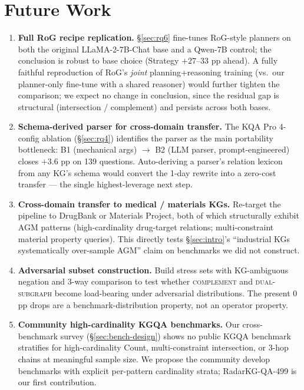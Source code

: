 \documentclass[11pt,a4paper]{article}
\newcommand{\op}[1]{\textsc{\small #1}}
\begin{document}
\section{Future Work}
\label{sec:future}

\begin{enumerate}[topsep=0pt,itemsep=2pt,leftmargin=*]
  \item \textbf{Full RoG recipe replication.} §\ref{sec:rq6} fine-tunes RoG-style planners on both the original LLaMA-2-7B-Chat base and a Qwen-7B control; the conclusion is robust to base choice (Strategy $+27$--$33$ pp ahead). A fully faithful reproduction of RoG's \emph{joint} planning+reasoning training (vs.\ our planner-only fine-tune with a shared reasoner) would further tighten the comparison; we expect no change in conclusion, since the residual gap is structural (intersection / complement) and persists across both bases.
  \item \textbf{Schema-derived parser for cross-domain transfer.} The KQA Pro 4-config ablation (§\ref{sec:rq4}) identifies the parser as the main portability bottleneck: B1 (mechanical args) $\to$ B2 (LLM parser, prompt-engineered) closes $+3.6$ pp on 139 questions. Auto-deriving a parser's relation lexicon from any KG's schema would convert the 1-day rewrite into a zero-cost transfer --- the single highest-leverage next step.
  \item \textbf{Cross-domain transfer to medical / materials KGs.} Re-target the pipeline to DrugBank or Materials Project, both of which structurally exhibit AGM patterns (high-cardinality drug-target relations; multi-constraint material property queries). This directly tests §\ref{sec:intro}'s ``industrial KGs systematically over-sample AGM'' claim on benchmarks we did not construct.
  \item \textbf{Adversarial subset construction.} Build stress sets with KG-ambiguous negation and 3-way comparison to test whether \op{complement} and \op{dual-subgraph} become load-bearing under adversarial distributions. The present 0 pp drops are a benchmark-distribution property, not an operator property.
  \item \textbf{Community high-cardinality KGQA benchmarks.} Our cross-benchmark survey (§\ref{sec:bench-design}) shows no public KGQA benchmark stratifies for high-cardinality Count, multi-constraint intersection, or 3-hop chains at meaningful sample size. We propose the community develop benchmarks with explicit per-pattern cardinality strata; RadarKG-QA-499 is our first contribution.
\end{enumerate}
\end{document}
